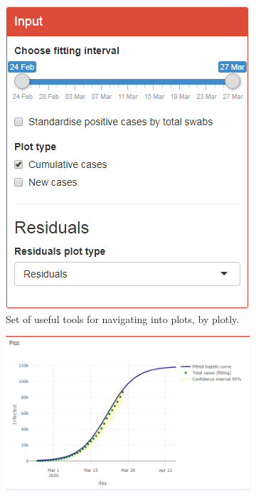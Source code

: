 \documentclass[
12pt, %
a4paper, %
oneside, %
headinclude,footinclude, %
BCOR5mm, %
]{scrartcl}
\begin{document}
\begin{figure}[H]
  \centering
\begin{subfigure}{0.6\textwidth}
  \includegraphics[width=1\linewidth]{Figures/logistic_input.png} 
  \caption{Set of useful tools for navigating into plots, by plotly.}
  \label{fig:logistic_input}
\end{subfigure} 
\hspace{5.5cm}
\begin{subfigure}{0.6\textwidth}
  \includegraphics[width=1\linewidth]{Figures/logistic_plot1.png} 

\end{subfigure}
\end{figure}
\end{document}

